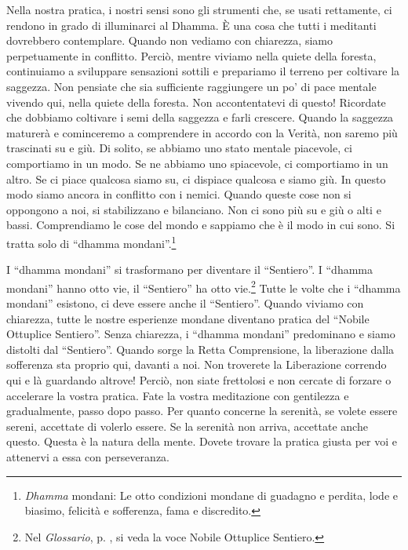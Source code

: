 Nella nostra pratica, i nostri sensi sono gli strumenti che, se usati
rettamente, ci rendono in grado di illuminarci al Dhamma. È una cosa che
tutti i meditanti dovrebbero contemplare. Quando non vediamo con
chiarezza, siamo perpetuamente in conflitto. Perciò, mentre viviamo
nella quiete della foresta, continuiamo a sviluppare sensazioni sottili
e prepariamo il terreno per coltivare la saggezza. Non pensiate che sia
sufficiente raggiungere un po' di pace mentale vivendo qui, nella quiete
della foresta. Non accontentatevi di questo! Ricordate che dobbiamo
coltivare i semi della saggezza e farli crescere. Quando la saggezza
maturerà e cominceremo a comprendere in accordo con la Verità, non
saremo più trascinati su e giù. Di solito, se abbiamo uno stato mentale
piacevole, ci comportiamo in un modo. Se ne abbiamo uno spiacevole, ci
comportiamo in un altro. Se ci piace qualcosa siamo su, ci dispiace
qualcosa e siamo giù. In questo modo siamo ancora in conflitto con i
nemici. Quando queste cose non si oppongono a noi, si stabilizzano e
bilanciano. Non ci sono più su e giù o alti e bassi. Comprendiamo le
cose del mondo e sappiamo che è il modo in cui sono. Si tratta solo di
``dhamma mondani''.\footnote{\emph{Dhamma} mondani: Le otto
  condizioni mondane di guadagno e perdita, lode e biasimo, felicità e
  sofferenza, fama e discredito.}

I ``dhamma mondani'' si trasformano per diventare il
``Sentiero''. I ``dhamma mondani'' hanno otto vie, il
``Sentiero'' ha otto vie.\footnote{Nel \emph{Glossario}, p. \pageref{glossary-ottuplice}, si veda la voce
  Nobile Ottuplice Sentiero.} Tutte le volte che i ``dhamma
mondani'' esistono, ci deve essere anche il ``Sentiero''. Quando viviamo
con chiarezza, tutte le nostre esperienze mondane diventano pratica del
``Nobile Ottuplice Sentiero''. Senza chiarezza, i ``dhamma
mondani'' predominano e siamo distolti dal ``Sentiero''. Quando sorge la
Retta Comprensione, la liberazione dalla sofferenza sta proprio qui,
davanti a noi. Non troverete la Liberazione correndo qui e là guardando
altrove! Perciò, non siate frettolosi e non cercate di forzare o
accelerare la vostra pratica. Fate la vostra meditazione con gentilezza
e gradualmente, passo dopo passo. Per quanto concerne la serenità, se
volete essere sereni, accettate di volerlo essere. Se la serenità non
arriva, accettate anche questo. Questa è la natura della mente. Dovete
trovare la pratica giusta per voi e attenervi a essa con perseveranza.

